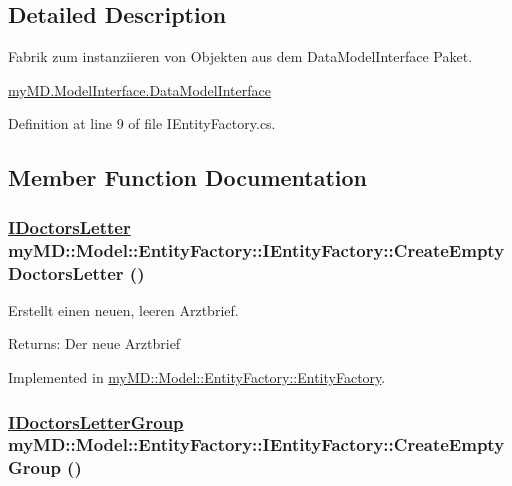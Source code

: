 \subsection{Detailed Description}
Fabrik zum instanziieren von Objekten aus dem Data\-Model\-Interface Paket. 

\hyperlink{namespacemy_m_d_1_1_model_interface_1_1_data_model_interface}{my\-MD.Model\-Interface.Data\-Model\-Interface}



Definition at line 9 of file IEntity\-Factory.cs.

\subsection{Member Function Documentation}
\hypertarget{interfacemy_m_d_1_1_model_1_1_entity_factory_1_1_i_entity_factory_c6e29019778e5a2ab76a6005701f90bd}{
\subsubsection[CreateEmptyDoctorsLetter]{\setlength{\rightskip}{0pt plus 5cm}\hyperlink{interfacemy_m_d_1_1_model_interface_1_1_data_model_interface_1_1_i_doctors_letter}{IDoctors\-Letter} my\-MD::Model::Entity\-Factory::IEntity\-Factory::Create\-Empty\-Doctors\-Letter ()}}
\label{d0/d33/interfacemy_m_d_1_1_model_1_1_entity_factory_1_1_i_entity_factory_c6e29019778e5a2ab76a6005701f90bd}


Erstellt einen neuen, leeren Arztbrief. 

\begin{Desc}
\item[Returns:]Der neue Arztbrief\end{Desc}


Implemented in \hyperlink{classmy_m_d_1_1_model_1_1_entity_factory_1_1_entity_factory_c6e29019778e5a2ab76a6005701f90bd}{my\-MD::Model::Entity\-Factory::Entity\-Factory}.\hypertarget{interfacemy_m_d_1_1_model_1_1_entity_factory_1_1_i_entity_factory_7ce2fe6e33d0a78829c47a6b2f35e0fe}{
\subsubsection[CreateEmptyGroup]{\setlength{\rightskip}{0pt plus 5cm}\hyperlink{interfacemy_m_d_1_1_model_interface_1_1_data_model_interface_1_1_i_doctors_letter_group}{IDoctors\-Letter\-Group} my\-MD::Model::Entity\-Factory::IEntity\-Factory::Create\-Empty\-Group ()}}
\label{d0/d33/interfacemy_m_d_1_1_model_1_1_entity_factory_1_1_i_entity_factory_7ce2fe6e33d0a78829c47a6b2f35e0fe}


